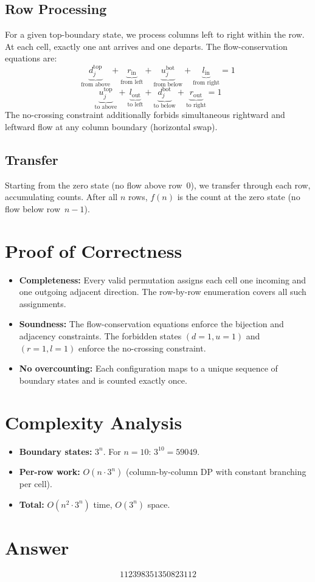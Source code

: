 \documentclass[11pt]{article}
\begin{document}
\subsection{Row Processing}
For a given top-boundary state, we process columns left to right within the row. At each cell, exactly one ant arrives and one departs. The flow-conservation equations are:
\[
\underbrace{d_j^{\text{top}}}_{\text{from above}} + \underbrace{r_{\text{in}}}_{\text{from left}} + \underbrace{u_j^{\text{bot}}}_{\text{from below}} + \underbrace{l_{\text{in}}}_{\text{from right}} = 1
\]
\[
\underbrace{u_j^{\text{top}}}_{\text{to above}} + \underbrace{l_{\text{out}}}_{\text{to left}} + \underbrace{d_j^{\text{bot}}}_{\text{to below}} + \underbrace{r_{\text{out}}}_{\text{to right}} = 1
\]
The no-crossing constraint additionally forbids simultaneous rightward and leftward flow at any column boundary (horizontal swap).

\subsection{Transfer}
Starting from the zero state (no flow above row~0), we transfer through each row, accumulating counts. After all $n$ rows, $f(n)$ is the count at the zero state (no flow below row~$n-1$).

\section{Proof of Correctness}
\begin{itemize}
    \item \textbf{Completeness:} Every valid permutation assigns each cell one incoming and one outgoing adjacent direction. The row-by-row enumeration covers all such assignments.
    \item \textbf{Soundness:} The flow-conservation equations enforce the bijection and adjacency constraints. The forbidden states $(d=1, u=1)$ and $(r=1, l=1)$ enforce the no-crossing constraint.
    \item \textbf{No overcounting:} Each configuration maps to a unique sequence of boundary states and is counted exactly once.
\end{itemize}

\section{Complexity Analysis}
\begin{itemize}
    \item \textbf{Boundary states:} $3^n$. For $n = 10$: $3^{10} = 59049$.
    \item \textbf{Per-row work:} $O(n \cdot 3^n)$ (column-by-column DP with constant branching per cell).
    \item \textbf{Total:} $O(n^2 \cdot 3^n)$ time, $O(3^n)$ space.
\end{itemize}

\section{Answer}

\[
\boxed{112398351350823112}
\]
\end{document}
